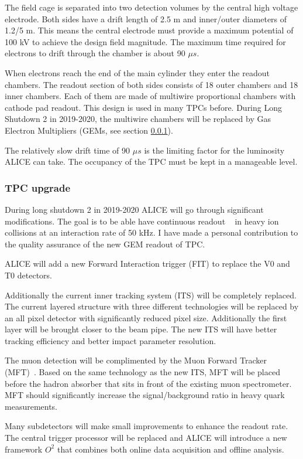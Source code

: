 The field cage is separated into two detection volumes by the central high voltage electrode. Both sides have a drift length of 2.5 m and inner/outer diameters of 1.2/5 m. This means the central electrode must provide a maximum potential of 100 kV to achieve the design field magnitude. The maximum time required for electrons to drift through the chamber is about 90 $\mu s$.

When electrons reach the end of the main cylinder they enter the readout chambers. The readout section of both sides consists of 18 outer chambers and 18 inner chambers. Each of them are made of multiwire proportional chambers with cathode pad readout. This design is used in many TPCs before. During Long Shutdown 2 in 2019-2020, the multiwire chambers will be replaced by Gas Electron Multipliers (GEMs, see section \ref{sec:tpcupgrade}).

The relatively slow drift time of 90 $\mu s$ is the limiting factor for the luminosity ALICE can take. The occupancy of the TPC must be kept in a manageable level. 


\subsubsection{TPC upgrade}
\label{sec:tpcupgrade}
During long shutdown 2 in 2019-2020 ALICE will go through significant modifications. The goal is to be able have continuous readout ~\cite{aliceupgrade} in heavy ion collisions at an interaction rate of 50 kHz. I have made a personal contribution to the quality assurance of the new GEM readout of TPC.

ALICE will add a new Forward Interaction trigger (FIT) to replace the V0 and T0 detectors. 

Additionally the current inner tracking system (ITS) will be completely replaced. The current layered structure with three different technologies will be replaced by an all pixel detector with significantly reduced pixel size. Additionally the first layer will be brought closer to the beam pipe. The new ITS will have better tracking efficiency and  better impact parameter resolution. 

The muon detection will be complimented by the Muon Forward Tracker (MFT)~\cite{mft}. Based on the same technology as the new ITS, MFT will be placed before the hadron absorber that sits in front of the existing muon spectrometer. MFT should significantly increase the signal/background ratio in heavy quark measurements.

Many subdetectors will make small improvements to enhance the readout rate. The central trigger processor will be replaced and ALICE will introduce a new framework $O^2$ that combines both online data acquisition and offline analysis.

